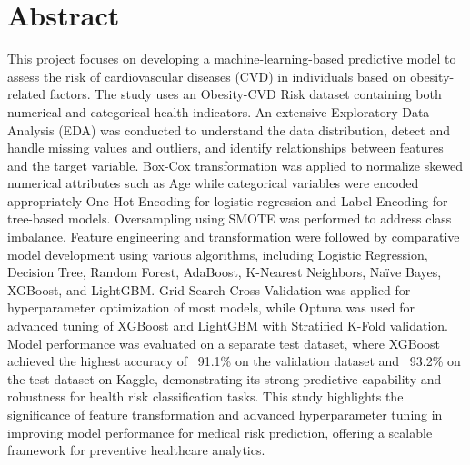 \documentclass[12pt,a4paper]{report}
\begin{document}
    {
        \let\clearpage\relax
        
    }

    {
        \let\clearpage\relax
        \chapter*{Abstract}
        This project focuses on developing a machine-learning-based predictive model to assess the risk of cardiovascular diseases (CVD) in individuals based on obesity-related factors.
        The study uses an Obesity-CVD Risk dataset containing both numerical and categorical health indicators.
        An extensive Exploratory Data Analysis (EDA) was conducted to understand the data distribution, detect and handle missing values and outliers, and identify relationships between features and the target variable.
        Box-Cox transformation was applied to normalize skewed numerical attributes such as Age while categorical variables were encoded appropriately-One-Hot Encoding for logistic regression and Label Encoding for tree-based models.
        Oversampling using SMOTE was performed to address class imbalance.
        Feature engineering and transformation were followed by comparative model development using various algorithms, including Logistic Regression, Decision Tree, Random Forest, AdaBoost, K-Nearest Neighbors, Na\"ive Bayes, XGBoost, and LightGBM. Grid Search Cross-Validation was applied for hyperparameter optimization of most models, while Optuna was used for advanced tuning of XGBoost and LightGBM with Stratified K-Fold validation.
        Model performance was evaluated on a separate test dataset, where XGBoost achieved the highest accuracy of ~91.1\% on the validation dataset and ~93.2\% on the test dataset on Kaggle, demonstrating its strong predictive capability and robustness for health risk classification tasks.
        This study highlights the significance of feature transformation and advanced hyperparameter tuning in improving model performance for medical risk prediction, offering a scalable framework for preventive healthcare analytics.

    }

    \tableofcontents
    \newpage
\end{document}
